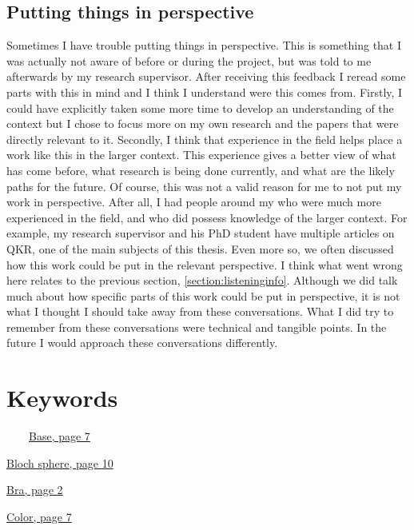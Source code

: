 \documentclass[]{article}
\begin{document}
\subsection{Putting things in perspective}

Sometimes I have trouble putting things in perspective. This is something that I was actually not aware of before or during the project, but was told to me afterwards by my research supervisor. After receiving this feedback I reread some parts with this in mind and I think I understand were this comes from. Firstly, I could have explicitly taken some more time to develop an understanding of the context but I chose to focus more on my own research and the papers that were directly relevant to it. Secondly, I think that experience in the field helps place a work like this in the larger context. This experience gives a better view of what has come before, what research is being done currently, and what are the likely paths for the future. Of course, this was not a valid reason for me to not put my work in perspective. After all, I had people around my who were much more experienced in the field, and who did possess knowledge of the larger context. For example, my research supervisor and his PhD student have multiple articles on QKR, one of the main subjects of this thesis. Even more so, we often discussed how this work could be put in the relevant perspective. I think what went wrong here relates to the previous section, \ref{section:listeninginfo}. Although we did talk much about how specific parts of this work could be put in perspective, it is not what I thought I should take away from these conversations. What I did try to remember from these conversations were technical and tangible points. In the future I would approach these conversations differently.



\appendix


\section{Keywords}
\label{Keywords}


~~~~\hyperref[coloursandbases]{Base, page 7}

\hyperref[section:basisandphasetranslations]{Bloch sphere, page 10}

\hyperref[braandket]{Bra, page 2}

\hyperref[coloursandbases]{Color, page 7}
\end{document}
